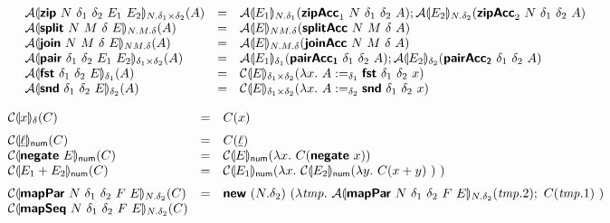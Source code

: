 \begin{figure}[H]
\begin{minipage}{1.0\linewidth}
\begin{displaymath}
\begin{array}{lcl}
        \mathcal{A}\llparenthesis \bm{\mathsf{zip}}~N~\delta_1~\delta_2~E_1~E_2 \rrparenthesis_{N.\delta_1\times\delta_2}(A)
        &=& \mathcal{A}\llparenthesis E_1 \rrparenthesis_{N.\delta_1}(\bm{\mathsf{zipAcc}}_1~N~\delta_1~\delta_2~A);
            \mathcal{A}\llparenthesis E_2 \rrparenthesis_{N.\delta_2}(\bm{\mathsf{zipAcc}}_2~N~\delta_1~\delta_2~A)
        \\
        \mathcal{A}\llparenthesis \bm{\mathsf{split}}~N~M~\delta~E \rrparenthesis_{N.M.\delta}(A)
        &=& \mathcal{A}\llparenthesis E \rrparenthesis_{NM.\delta}(\bm{\mathsf{splitAcc}}~N~M~\delta~A)
        \\
        \mathcal{A}\llparenthesis \bm{\mathsf{join}}~N~M~\delta~E \rrparenthesis_{NM.\delta}(A)
        &=& \mathcal{A}\llparenthesis E \rrparenthesis_{N.M.\delta}(\bm{\mathsf{joinAcc}}~N~M~\delta~A)
        \\
        \mathcal{A}\llparenthesis \bm{\mathsf{pair}}~\delta_1~\delta_2~E_1~E_2 \rrparenthesis_{\delta_1\times\delta_2}(A)
        &=& \mathcal{A}\llparenthesis E_1 \rrparenthesis_{\delta_1}(\bm{\mathsf{pairAcc_1}}~\delta_1~\delta_2~A);
            \mathcal{A}\llparenthesis E_2 \rrparenthesis_{\delta_2}(\bm{\mathsf{pairAcc_2}}~\delta_1~\delta_2~A)
        \\
        \mathcal{A}\llparenthesis \bm{\mathsf{fst}}~{\delta_1}~{\delta_2}~E \rrparenthesis_{\delta_1}(A)
        &=& \mathcal{C}\llparenthesis E \rrparenthesis_{\delta_1\times\delta_2}(\lambda x.~A :=_{\delta_1} \bm{\mathsf{fst}}~{\delta_1}~{\delta_2}~x)
        \\
        \mathcal{A}\llparenthesis \bm{\mathsf{snd}}~{\delta_1}~{\delta_2}~E \rrparenthesis_{\delta_2}(A)
        &=& \mathcal{C}\llparenthesis E \rrparenthesis_{\delta_1\times\delta_2}(\lambda x.~A :=_{\delta_2} \bm{\mathsf{snd}}~{\delta_1}~{\delta_2}~x)
      \end{array}
    \end{displaymath}
    \label{fig:transone}
  \end{minipage}
  \begin{minipage}{1.0\linewidth}
    \begin{displaymath}
      \begin{array}{lcl}
        \semE{x}_\delta(C)
        &=& C(x)
        \medskip\\
        \semE{\underline{\ell}}_{\num}(C)
        &=& C(\underline{\ell})
        \\
        \semE{\prim{negate}~E}_{\num}(C)
        &=& \semE{E}_{\num}(\lambda x.~C(\prim{negate}~x))
        \\
        \semE{E_1 + E_2}_{\num}(C)
        &=& \semE{E_1}_{\num}(\lambda x.~\semE{E_2}_{\num}(\lambda y.~C(x+y)~)~)
        \medskip\\
        \semE{\prim{mapPar}~N~\delta_1~\delta_2~F~E}_{N.\delta_2}(C)
        &=& \prim{new}~(N.\delta_2)~(\lambda \mathit{tmp}.~\semA{\prim{mapPar}~N~\delta_1~\delta_2~F~E}_{N.\delta_2}(\mathit{tmp}.2);~C(\mathit{tmp}.1)~)
        \\
        \semE{\prim{mapSeq}~N~\delta_1~\delta_2~F~E}_{N.\delta_2}(C)

\end{array}
\end{displaymath}
\end{minipage}
\end{figure}
